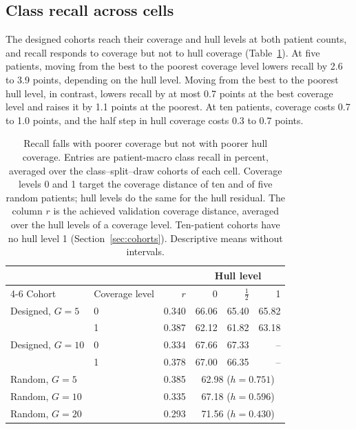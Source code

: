 \subsection{Class recall across cells}
\label{sec:cell-results}
The designed cohorts reach their coverage and hull levels at both patient counts, and recall responds to coverage but not to hull coverage (Table~\ref{tab:cell-recall}). At five patients, moving from the best to the poorest coverage level lowers recall by 2.6 to 3.9 points, depending on the hull level. Moving from the best to the poorest hull level, in contrast, lowers recall by at most 0.7 points at the best coverage level and raises it by 1.1 points at the poorest. At ten patients, coverage costs 0.7 to 1.0 points, and the half step in hull coverage costs 0.3 to 0.7 points.

\begin{table}[htbp]
\centering
\small
\renewcommand{\arraystretch}{1.15}
\begin{tabular}{@{}llrrrr@{}}
\toprule
 & & & \multicolumn{3}{c}{Hull level} \\
\cmidrule(l){4-6}
Cohort & Coverage level & $r$ & 0 & $\tfrac12$ & 1 \\
\midrule
Designed, $G=5$ & 0 & 0.340 & 66.06 & 65.40 & 65.82 \\
 & 1 & 0.387 & 62.12 & 61.82 & 63.18 \\
\addlinespace
Designed, $G=10$ & 0 & 0.334 & 67.66 & 67.33 & -- \\
 & 1 & 0.378 & 67.00 & 66.35 & -- \\
\midrule
Random, $G=5$ & & 0.385 & \multicolumn{3}{c}{62.98 ($h=0.751$)} \\
Random, $G=10$ & & 0.335 & \multicolumn{3}{c}{67.18 ($h=0.596$)} \\
Random, $G=20$ & & 0.293 & \multicolumn{3}{c}{71.56 ($h=0.430$)} \\
\bottomrule
\end{tabular}
\caption{Recall falls with poorer coverage but not with poorer hull coverage. Entries are patient-macro class recall in percent, averaged over the class--split--draw cohorts of each cell. Coverage levels 0 and 1 target the coverage distance of ten and of five random patients; hull levels do the same for the hull residual. The column $r$ is the achieved validation coverage distance, averaged over the hull levels of a coverage level. Ten-patient cohorts have no hull level 1 (Section~\ref{sec:cohorts}). Descriptive means without intervals.}
\label{tab:cell-recall}
\end{table}

